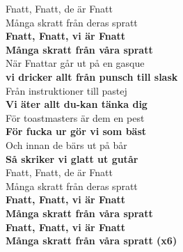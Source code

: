 \documentclass[a6paper, 10pt, twoside]{article}
\begin{document}
\begin{lyrics}
Fnatt, Fnatt, de är Fnatt\\
Många skratt från deras spratt\\
\textbf{Fnatt, Fnatt, vi är Fnatt}\\
\textbf{Många skratt från våra spratt}
\vspace{5pt}\\
När Fnattar går ut på en gasque\\
\textbf{vi dricker allt från punsch till slask}
\vspace{5pt}\\
Från instruktioner till pastej\\
\textbf{Vi äter allt du-kan tänka dig}
\vspace{5pt}\\
För toastmasters är dem en pest\\
\textbf{För fucka ur gör vi som bäst}
\vspace{5pt}\\
Och innan de bärs ut på bår\\
\textbf{Så skriker vi glatt ut gutår}
\vspace{5pt}\\
Fnatt, Fnatt, de är Fnatt\\
Många skratt från deras spratt\\
\textbf{Fnatt, Fnatt, vi är Fnatt}\\
\textbf{Många skratt från våra spratt}
\vspace{5pt}\\
\textbf{Fnatt, Fnatt, vi är Fnatt}\\
\textbf{Många skratt från våra spratt (x6)}\\
\end{lyrics}


\end{document}
